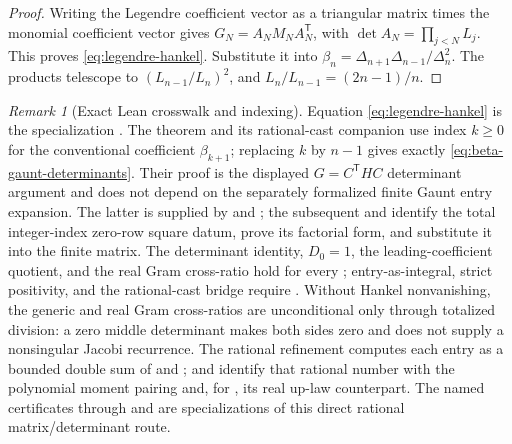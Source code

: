 \documentclass[11pt,oneside]{article}
\theoremstyle{definition}
\theoremstyle{remark}
\newtheorem{remark}[theorem]{Remark}
\numberwithin{equation}{section}
\begin{document}
\begin{proof}
Writing the Legendre coefficient vector as a triangular matrix times the
monomial coefficient vector gives $G_N=A_NM_NA_N^{\mathsf T}$, with
$\det A_N=\prod_{j<N}L_j$.  This proves
\cref{eq:legendre-hankel}.  Substitute it into
$\beta_n=\Delta_{n+1}\Delta_{n-1}/\Delta_n^2$.  The products telescope to
$(L_{n-1}/L_n)^2$, and
$L_n/L_{n-1}=(2n-1)/n$.
\end{proof}

\begin{remark}[Exact Lean crosswalk and indexing]
Equation \eqref{eq:legendre-hankel} is the specialization
.  The theorem
 and its
rational-cast companion
 use index $k\ge0$
for the conventional coefficient $\beta_{k+1}$; replacing $k$ by $n-1$ gives
exactly \eqref{eq:beta-gaunt-determinants}.  Their proof is the displayed
$G=C^{\mathsf T}HC$ determinant argument and does not depend on the separately
formalized finite Gaunt entry expansion.  The latter is supplied by
 and ; the subsequent
 and
 identify the total integer-index
zero-row square datum, prove its factorial form, and substitute it into the
finite matrix.
The determinant identity, $D_0=1$, the
leading-coefficient quotient, and the real Gram cross-ratio hold for every
; entry-as-integral, strict positivity, and the rational-cast
bridge require .  Without Hankel nonvanishing, the generic and real
Gram cross-ratios are unconditional only through totalized division: a zero middle
determinant makes both sides zero and does not supply a nonsingular Jacobi recurrence.
The rational refinement  computes each entry as a
bounded double sum of  and
;  and
 identify that rational number with the
polynomial moment pairing and, for , its real up-law counterpart.
The named certificates  through
 and
 are specializations of this direct rational
matrix/determinant route.


\end{remark}
\end{document}
